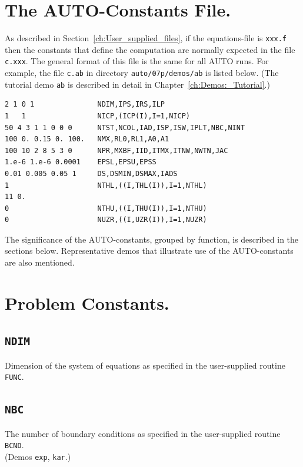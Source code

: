 \documentclass[12pt]{report}
\begin{document}
\section{ The {\cal AUTO}-Constants File.} \label{sec:The_AUTO_constants_file}
As described in Section~\ref{ch:User_supplied_files}, 
if the equations-file is {\tt xxx.f} 
then the constants that define the computation 
are normally expected in the file  {\tt c.xxx}.
The general format of this file is the same for all {\cal AUTO} runs.
For example, the file {\tt c.ab} 
in directory {\tt auto/07p/demos/ab} is listed below.
(The tutorial demo {\tt ab} is described in detail in 
Chapter~\ref{ch:Demos:_Tutorial}.)  

\begin{verbatim}
2 1 0 1               NDIM,IPS,IRS,ILP
1   1                 NICP,(ICP(I),I=1,NICP)
50 4 3 1 1 0 0 0      NTST,NCOL,IAD,ISP,ISW,IPLT,NBC,NINT
100 0. 0.15 0. 100.   NMX,RL0,RL1,A0,A1
100 10 2 8 5 3 0      NPR,MXBF,IID,ITMX,ITNW,NWTN,JAC
1.e-6 1.e-6 0.0001    EPSL,EPSU,EPSS
0.01 0.005 0.05 1     DS,DSMIN,DSMAX,IADS
1                     NTHL,((I,THL(I)),I=1,NTHL)
11 0.
0                     NTHU,((I,THU(I)),I=1,NTHU)
0                     NUZR,((I,UZR(I)),I=1,NUZR)
\end{verbatim}

The significance of the {\cal AUTO}-constants, grouped by function, is 
described in the sections below. 
Representative demos that illustrate use of the {\cal AUTO}-constants
are also mentioned.

\section{ Problem Constants.} \label{sec:Problem_constants}
\subsection{\tt NDIM} \label{sec:NDIM}
 Dimension of the system of equations as specified in the user-supplied
 routine {\tt FUNC}.

\subsection{\tt NBC}  \label{sec:NBC}
 The number of boundary conditions as specified in the user-supplied
 routine {\tt BCND}. \\
(Demos {\tt exp}, {\tt kar}.)
\end{document}
